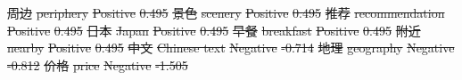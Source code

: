 \documentclass[smallextended,natbib]{svjour3}       %
\providecommand{\DIFdel}[1]{{\protect\color{red}\sout{#1}}}                      %
\providecommand{\DIFdelFL}[1]{\DIFdel{#1}} %
\begin{document}
\DIFdelFL{周边 }%
\DIFdelFL{periphery 
        }%
\DIFdelFL{Positive 
        }%
\DIFdelFL{0.495 }%
\DIFdelFL{景色 }%
\DIFdelFL{scenery 
        }%
\DIFdelFL{Positive 
        }%
\DIFdelFL{0.495 }%
\DIFdelFL{推荐 }%
\DIFdelFL{recommendation 
        }%
\DIFdelFL{Positive 
        }%
\DIFdelFL{0.495 }%
\DIFdelFL{日本 }%
\DIFdelFL{Japan 
        }%
\DIFdelFL{Positive 
        }%
\DIFdelFL{0.495 }%
\DIFdelFL{早餐 }%
\DIFdelFL{breakfast 
        }%
\DIFdelFL{Positive 
        }%
\DIFdelFL{0.495 }%
\DIFdelFL{附近 }%
\DIFdelFL{nearby 
        }%
\DIFdelFL{Positive 
        }%
\DIFdelFL{0.495 }%
\DIFdelFL{中文 }%
\DIFdelFL{Chinese text 
        }%
\DIFdelFL{Negative 
        }%
\DIFdelFL{-0.714 }%
\DIFdelFL{地理 }%
\DIFdelFL{geography 
        }%
\DIFdelFL{Negative 
        }%
\DIFdelFL{-0.812 }%
\DIFdelFL{价格 }%
\DIFdelFL{price 
        }%
\DIFdelFL{Negative 
        }%
\DIFdelFL{-1.505 }%
\end{document}
